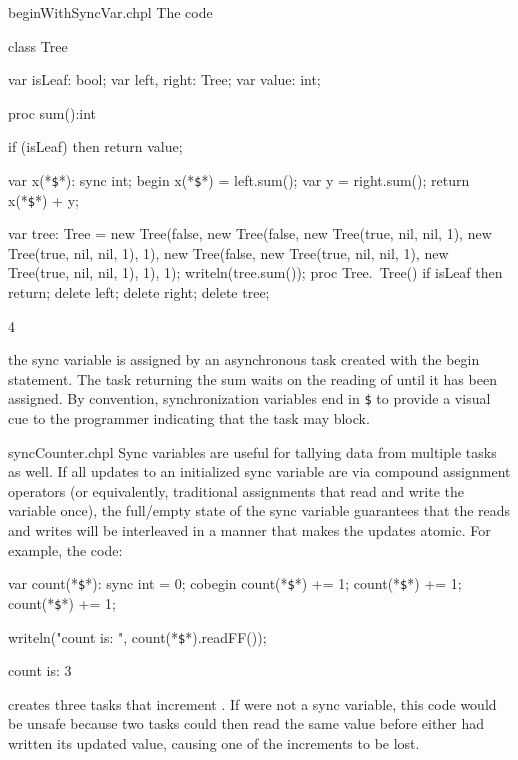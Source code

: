 \begin{chapelexample}{beginWithSyncVar.chpl}
The code
\begin{chapel}
class Tree {
  var isLeaf: bool;
  var left, right: Tree;
  var value: int;

  proc sum():int {
    if (isLeaf) then 
       return value;

    var x(*\texttt{\$}*): sync int;
    begin x(*\texttt{\$}*) = left.sum();
    var y = right.sum();
    return x(*\texttt{\$}*) + y;
  }
}
\end{chapel}
\begin{chapelpost}
var tree: Tree = new Tree(false, new Tree(false, new Tree(true, nil, nil, 1),
                                                 new Tree(true, nil, nil, 1), 1),
                                 new Tree(false, new Tree(true, nil, nil, 1),
                                                 new Tree(true, nil, nil, 1), 1), 1);
writeln(tree.sum());
proc Tree.~Tree() {
  if isLeaf then return;
  delete left;
  delete right;
}
delete tree;
\end{chapelpost}
\begin{chapeloutput}
4
\end{chapeloutput}
the sync variable  is assigned by an
asynchronous task created with the begin statement.  The task
returning the sum waits on the reading of 
until it has been assigned.  By convention, synchronization variables
end in \texttt{\$} to provide a visual cue to the programmer
indicating that the task may block.
\end{chapelexample}

\begin{chapelexample}{syncCounter.chpl}
Sync variables are useful for tallying data from multiple tasks as
well.  If all updates to an initialized sync variable are via compound
assignment operators (or equivalently, traditional assignments that
read and write the variable once), the full/empty state of the sync
variable guarantees that the reads and writes will be interleaved
in a manner that makes the updates atomic.  For example, the code:
\begin{chapel}
var count(*\texttt{\$}*): sync int = 0;
cobegin {
  count(*\texttt{\$}*) += 1;
  count(*\texttt{\$}*) += 1;
  count(*\texttt{\$}*) += 1;
}
\end{chapel}
\begin{chapelpost}
writeln("count is: ", count(*\texttt{\$}*).readFF());
\end{chapelpost}
\begin{chapeloutput}
count is: 3
\end{chapeloutput}
creates three tasks that increment .
If  were not a sync variable, this code
would be unsafe because two tasks could then read the same value
before either had written its updated value, causing one of the
increments to be lost.
\end{chapelexample}

